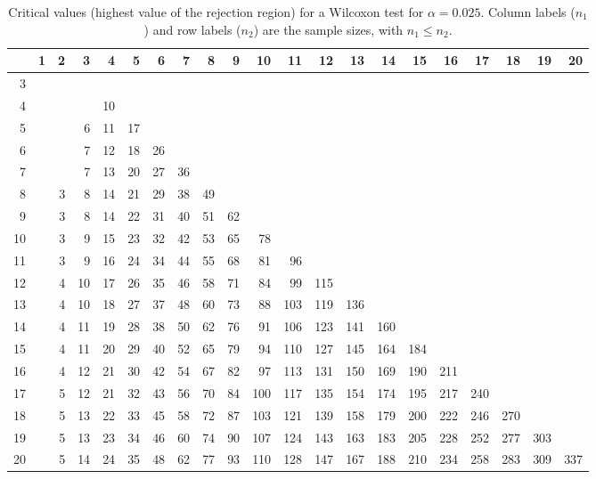 \begin{table}[ht]
\centering
\begin{tabular}{rrrrrrrrrrrrrrrrrrrrr}
  \hline
 & 1 & 2 & 3 & 4 & 5 & 6 & 7 & 8 & 9 & 10 & 11 & 12 & 13 & 14 & 15 & 16 & 17 & 18 & 19 & 20 \\ 
  \hline
  3 &  &  &  &  &  &  &  &  &  &  &  &  &  &  &  &  &  &  &  &  \\ 
  4 &  &  &  & 10 &  &  &  &  &  &  &  &  &  &  &  &  &  &  &  &  \\ 
  5 &  &  & 6 & 11 & 17 &  &  &  &  &  &  &  &  &  &  &  &  &  &  &  \\ 
  6 &  &  & 7 & 12 & 18 & 26 &  &  &  &  &  &  &  &  &  &  &  &  &  &  \\ 
  7 &  &  & 7 & 13 & 20 & 27 & 36 &  &  &  &  &  &  &  &  &  &  &  &  &  \\ 
  8 &  & 3 & 8 & 14 & 21 & 29 & 38 & 49 &  &  &  &  &  &  &  &  &  &  &  &  \\ 
  9 &  & 3 & 8 & 14 & 22 & 31 & 40 & 51 & 62 &  &  &  &  &  &  &  &  &  &  &  \\ 
  10 &  & 3 & 9 & 15 & 23 & 32 & 42 & 53 & 65 & 78 &  &  &  &  &  &  &  &  &  &  \\ 
  11 &  & 3 & 9 & 16 & 24 & 34 & 44 & 55 & 68 & 81 & 96 &  &  &  &  &  &  &  &  &  \\ 
  12 &  & 4 & 10 & 17 & 26 & 35 & 46 & 58 & 71 & 84 & 99 & 115 &  &  &  &  &  &  &  &  \\ 
  13 &  & 4 & 10 & 18 & 27 & 37 & 48 & 60 & 73 & 88 & 103 & 119 & 136 &  &  &  &  &  &  &  \\ 
  14 &  & 4 & 11 & 19 & 28 & 38 & 50 & 62 & 76 & 91 & 106 & 123 & 141 & 160 &  &  &  &  &  &  \\ 
  15 &  & 4 & 11 & 20 & 29 & 40 & 52 & 65 & 79 & 94 & 110 & 127 & 145 & 164 & 184 &  &  &  &  &  \\ 
  16 &  & 4 & 12 & 21 & 30 & 42 & 54 & 67 & 82 & 97 & 113 & 131 & 150 & 169 & 190 & 211 &  &  &  &  \\ 
  17 &  & 5 & 12 & 21 & 32 & 43 & 56 & 70 & 84 & 100 & 117 & 135 & 154 & 174 & 195 & 217 & 240 &  &  &  \\ 
  18 &  & 5 & 13 & 22 & 33 & 45 & 58 & 72 & 87 & 103 & 121 & 139 & 158 & 179 & 200 & 222 & 246 & 270 &  &  \\ 
  19 &  & 5 & 13 & 23 & 34 & 46 & 60 & 74 & 90 & 107 & 124 & 143 & 163 & 183 & 205 & 228 & 252 & 277 & 303 &  \\ 
  20 &  & 5 & 14 & 24 & 35 & 48 & 62 & 77 & 93 & 110 & 128 & 147 & 167 & 188 & 210 & 234 & 258 & 283 & 309 & 337 \\ 
   \hline
\end{tabular}
\caption{Critical values (highest value of the rejection region) for a Wilcoxon test for $\alpha=0.025$. Column labels ($n_1$) and row labels ($n_2$) are the sample sizes, with ${n_1}\leq{n_2}$.} 
\end{table}
